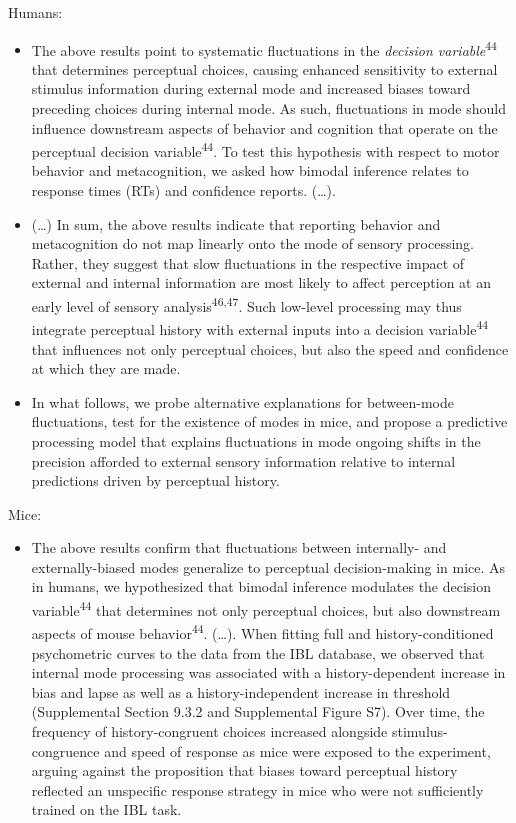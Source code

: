 \documentclass[
]{article}
\providecommand{\tightlist}{%
  \setlength{\itemsep}{0pt}\setlength{\parskip}{0pt}}
\begin{document}
Humans:

\begin{itemize}
\item
  The above results point to systematic fluctuations in the
  \emph{decision variable}\textsuperscript{44} that determines
  perceptual choices, causing enhanced sensitivity to external stimulus
  information during external mode and increased biases toward preceding
  choices during internal mode. As such, fluctuations in mode should
  influence downstream aspects of behavior and cognition that operate on
  the perceptual decision variable\textsuperscript{44}. To test this
  hypothesis with respect to motor behavior and metacognition, we asked
  how bimodal inference relates to response times (RTs) and confidence
  reports. (\ldots).
\item
  (\ldots) In sum, the above results indicate that reporting behavior
  and metacognition do not map linearly onto the mode of sensory
  processing. Rather, they suggest that slow fluctuations in the
  respective impact of external and internal information are most likely
  to affect perception at an early level of sensory
  analysis\textsuperscript{46,47}. Such low-level processing may thus
  integrate perceptual history with external inputs into a decision
  variable\textsuperscript{44} that influences not only perceptual
  choices, but also the speed and confidence at which they are made.
\item
  In what follows, we probe alternative explanations for between-mode
  fluctuations, test for the existence of modes in mice, and propose a
  predictive processing model that explains fluctuations in mode ongoing
  shifts in the precision afforded to external sensory information
  relative to internal predictions driven by perceptual history.
\end{itemize}

Mice:

\begin{itemize}
\tightlist
\item
  The above results confirm that fluctuations between internally- and
  externally-biased modes generalize to perceptual decision-making in
  mice. As in humans, we hypothesized that bimodal inference modulates
  the decision variable\textsuperscript{44} that determines not only
  perceptual choices, but also downstream aspects of mouse
  behavior\textsuperscript{44}. (\ldots). When fitting full and
  history-conditioned psychometric curves to the data from the IBL
  database, we observed that internal mode processing was associated
  with a history-dependent increase in bias and lapse as well as a
  history-independent increase in threshold (Supplemental Section 9.3.2
  and Supplemental Figure S7). Over time, the frequency of
  history-congruent choices increased alongside stimulus-congruence and
  speed of response as mice were exposed to the experiment, arguing
  against the proposition that biases toward perceptual history
  reflected an unspecific response strategy in mice who were not
  sufficiently trained on the IBL task.
\end{itemize}
\end{document}

